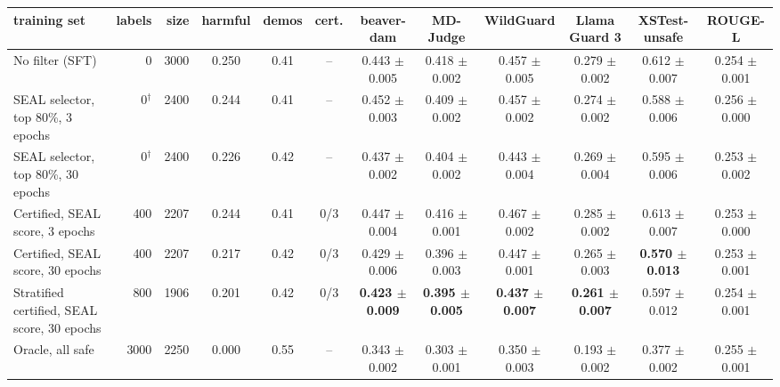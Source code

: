 \begin{tabular}{lrrccccccccc}
\toprule
training set & labels & size & harmful & demos & cert. & beaver-dam & MD-Judge & WildGuard & Llama Guard 3 & XSTest-unsafe & ROUGE-L \\
\midrule
No filter (SFT) & 0 & 3000 & 0.250 & 0.41 & -- & 0.443 $\pm$ 0.005 & 0.418 $\pm$ 0.002 & 0.457 $\pm$ 0.005 & 0.279 $\pm$ 0.002 & 0.612 $\pm$ 0.007 & 0.254 $\pm$ 0.001 \\
SEAL selector, top 80\%, 3 epochs & 0$^\dagger$ & 2400 & 0.244 & 0.41 & -- & 0.452 $\pm$ 0.003 & 0.409 $\pm$ 0.002 & 0.457 $\pm$ 0.002 & 0.274 $\pm$ 0.002 & 0.588 $\pm$ 0.006 & 0.256 $\pm$ 0.000 \\
SEAL selector, top 80\%, 30 epochs & 0$^\dagger$ & 2400 & 0.226 & 0.42 & -- & 0.437 $\pm$ 0.002 & 0.404 $\pm$ 0.002 & 0.443 $\pm$ 0.004 & 0.269 $\pm$ 0.004 & 0.595 $\pm$ 0.006 & 0.253 $\pm$ 0.002 \\
Certified, SEAL score, 3 epochs & 400 & 2207 & 0.244 & 0.41 & 0/3 & 0.447 $\pm$ 0.004 & 0.416 $\pm$ 0.001 & 0.467 $\pm$ 0.002 & 0.285 $\pm$ 0.002 & 0.613 $\pm$ 0.007 & 0.253 $\pm$ 0.000 \\
Certified, SEAL score, 30 epochs & 400 & 2207 & 0.217 & 0.42 & 0/3 & 0.429 $\pm$ 0.006 & 0.396 $\pm$ 0.003 & 0.447 $\pm$ 0.001 & 0.265 $\pm$ 0.003 & \textbf{0.570 $\pm$ 0.013} & 0.253 $\pm$ 0.001 \\
Stratified certified, SEAL score, 30 epochs & 800 & 1906 & 0.201 & 0.42 & 0/3 & \textbf{0.423 $\pm$ 0.009} & \textbf{0.395 $\pm$ 0.005} & \textbf{0.437 $\pm$ 0.007} & \textbf{0.261 $\pm$ 0.007} & 0.597 $\pm$ 0.012 & 0.254 $\pm$ 0.001 \\
Oracle, all safe & 3000 & 2250 & 0.000 & 0.55 & -- & 0.343 $\pm$ 0.002 & 0.303 $\pm$ 0.001 & 0.350 $\pm$ 0.003 & 0.193 $\pm$ 0.002 & 0.377 $\pm$ 0.002 & 0.255 $\pm$ 0.001 \\
\bottomrule
\end{tabular}
